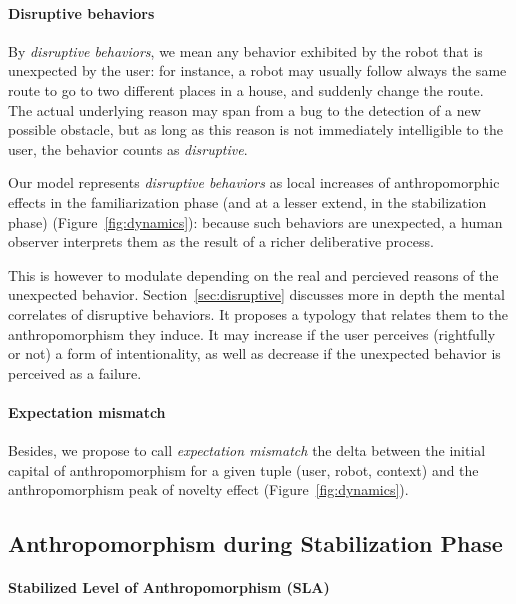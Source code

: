 \documentclass[lettersize, apacite, twoside, HRI]{apa_HRI}
\begin{document}
\paragraph{Disruptive behaviors}

By \emph{disruptive behaviors}, we mean any behavior exhibited by the robot
that is unexpected by the user: for instance, a robot may usually follow always
the same route to go to two different places in a house, and suddenly change
the route. The actual underlying reason may span from a bug to the detection of
a new possible obstacle, but as long as this reason is not immediately
intelligible to the user, the behavior counts as \emph{disruptive}.

Our model represents \emph{disruptive behaviors} as local increases of
anthropomorphic effects in the familiarization phase (and at a lesser extend,
in the stabilization phase) (Figure~\ref{fig:dynamics}): because such behaviors
are unexpected, a human observer interprets them as the result of a richer
deliberative process.

This is however to modulate depending on the real and percieved reasons of the
unexpected behavior.  Section~\ref{sec:disruptive} discusses more in depth the
mental correlates of disruptive behaviors. It proposes a typology that relates
them to the anthropomorphism they induce. It may increase if the user perceives
(rightfully or not) a form of intentionality, as well as decrease if the
unexpected behavior is perceived as a failure.

\paragraph{Expectation mismatch}

Besides, we propose to call \emph{expectation mismatch} the delta between the
initial capital of anthropomorphism for a given tuple (user, robot, context)
and the anthropomorphism peak of novelty effect (Figure~\ref{fig:dynamics}).

\subsection{Anthropomorphism during Stabilization Phase}
\label{sec:stabilization}

\paragraph{Stabilized Level of Anthropomorphism (SLA)}
\end{document}
